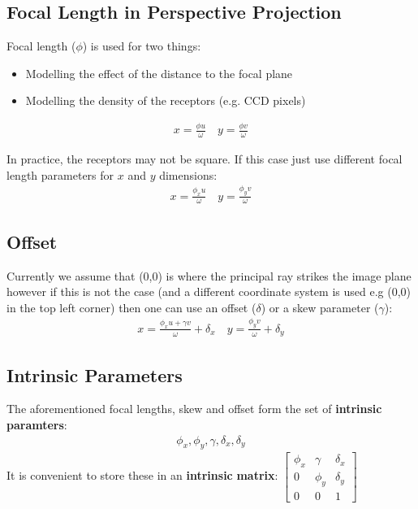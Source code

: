 \documentclass{article}
\begin{document}
\subsection{Focal Length in Perspective Projection}
Focal length ($\phi$) is used for two things:
\begin{itemize}
	\item Modelling the effect of the distance to the focal plane
	\item Modelling the density of the receptors (e.g. CCD pixels)
\end{itemize}

\begin{align*}
	x = \frac{\phi u}{\omega} \quad  y = \frac{\phi v}{\omega}
\end{align*}

In practice, the receptors may not be square.
If this case just use different focal length parameters for $x$ and $y$ dimensions:
\begin{align*}
	x = \frac{\phi_x u}{\omega} \quad  y = \frac{\phi_y v}{\omega}
\end{align*}

\subsection{Offset}
Currently we assume that (0,0) is where the principal ray strikes the image plane however if this is not the case (and a different coordinate system is used e.g (0,0) in the top left corner) then one can use an offset ($\delta$) or a skew parameter ($\gamma$):
\begin{align*}
	x = \frac{\phi_x u + \gamma v}{\omega}+\delta_x \quad  y = \frac{\phi_y v}{\omega}+\delta_y
\end{align*}
\subsection{Intrinsic Parameters}
The aforementioned focal lengths, skew and offset form the set of {\bf intrinsic} {\bf paramters}:
\begin{align*}
	{\phi_x, \phi_y, \gamma, \delta_x, \delta_y}
\end{align*}
It is convenient to store these in an {\bf intrinsic} {\bf matrix}:
$
\begin{bmatrix}
	\phi_x & \gamma & \delta_x \\
	0 & \phi_y & \delta_y \\
	0 & 0 & 1
\end{bmatrix}
$
\end{document}
